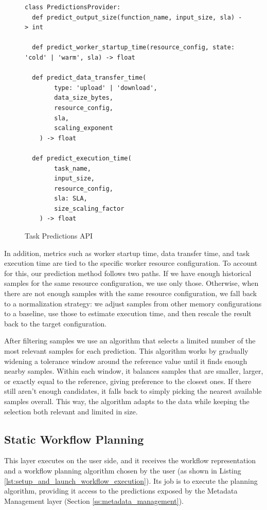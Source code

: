 \documentclass[conference]{IEEEtran}
\begin{document}
\begin{figure}[h]
\centering
\begin{lstlisting}[basicstyle=\ttfamily\footnotesize, columns=fullflexible, breaklines=true]
class PredictionsProvider:
  def predict_output_size(function_name, input_size, sla) -> int

  def predict_worker_startup_time(resource_config, state: 'cold' | 'warm', sla) -> float

  def predict_data_transfer_time(
        type: 'upload' | 'download',
        data_size_bytes,
        resource_config,
        sla,
        scaling_exponent
    ) -> float

  def predict_execution_time(
        task_name,
        input_size,
        resource_config,
        sla: SLA,
        size_scaling_factor
    ) -> float
\end{lstlisting}
\caption{Task Predictions API}
\label{lst:task_predictions_api}
\end{figure}

In addition, metrics such as worker startup time, data transfer time, and task execution time are tied to the specific worker resource configuration. To account for this, our prediction method follows two paths. If we have enough historical samples for the same resource configuration, we use only those. Otherwise, when there are not enough samples with the same resource configuration, we fall back to a normalization strategy: we adjust samples from other memory configurations to a baseline, use those to estimate execution time, and then rescale the result back to the target configuration. 

After filtering samples we use an algorithm that selects a limited number of the most relevant samples for each prediction. This algorithm works by gradually widening a tolerance window around the reference value until it finds enough nearby samples. Within each window, it balances samples that are smaller, larger, or exactly equal to the reference, giving preference to the closest ones. If there still aren't enough candidates, it falls back to simply picking the nearest available samples overall. This way, the algorithm adapts to the data while keeping the selection both relevant and limited in size.

\subsection{Static Workflow Planning}
This layer executes on the user side, and it receives the workflow representation and a workflow planning algorithm chosen by the user (as shown in Listing \ref{lst:setup_and_launch_workflow_execution}). Its job is to execute the planning algorithm, providing it access to the predictions exposed by the Metadata Management layer (Section \ref{ss:metadata_management}).
\end{document}
